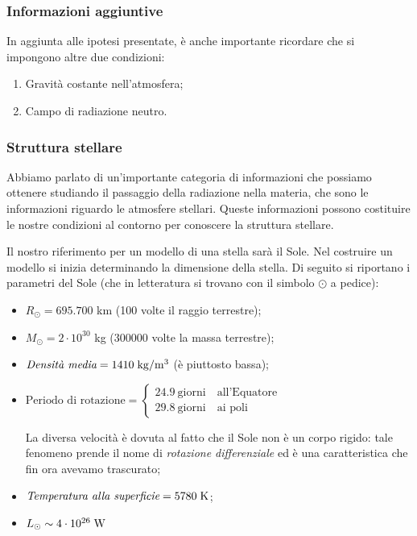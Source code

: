 \subsubsection{Informazioni aggiuntive}
In aggiunta alle ipotesi presentate, è anche importante ricordare che si impongono altre due condizioni: 

\begin{enumerate}
   \item Gravità costante nell'atmosfera;
   \item Campo di radiazione neutro.
\end{enumerate}

\subsubsection{Struttura stellare}
Abbiamo parlato di un'importante categoria di informazioni che possiamo ottenere studiando il passaggio della radiazione nella materia, che sono le informazioni riguardo le atmosfere stellari. Queste informazioni possono costituire le nostre condizioni al contorno per conoscere la struttura stellare.

Il nostro riferimento per un modello di una stella sarà il Sole. Nel costruire un modello si inizia determinando la dimensione della stella. Di seguito si riportano i parametri del Sole (che in letteratura si trovano con il simbolo $\odot$ a pedice):

\begin{itemize}
    \item $R_{\odot}=695.700$ km (100 volte il raggio terrestre);
    \item $M_{\odot}=2\cdot 10^{30}$ kg (300000 volte la massa terrestre);
    \item $\textit{Densità media}=1410 \; \rm kg/m^3$ (è piuttosto bassa);
    \item $\text{Periodo di rotazione}=
    \begin{cases}
    24.9\ \text{giorni}\quad \text{all'Equatore}\\
    29.8\ \text{giorni}\quad \text{ai poli}\end{cases}$

    La diversa velocità è dovuta al fatto che il Sole non è un corpo rigido: tale fenomeno prende il nome di \textit{rotazione differenziale} ed è una caratteristica che fin ora avevamo trascurato;
    \item $\textit{Temperatura alla superficie}=5780 \; \rm K$;
    \item $L_{\odot}\sim 4\cdot 10^{26} \; \rm W$
\end{itemize}

